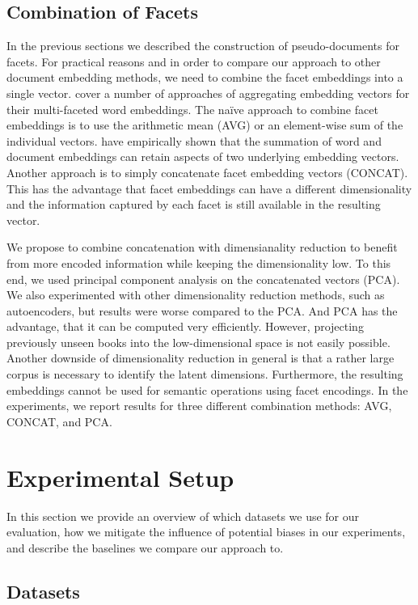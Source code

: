 \documentclass[11pt]{article}
\begin{document}
\subsection{Combination of Facets}

In the previous sections we described the construction of pseudo-documents for facets.
For practical reasons and in order to compare our approach to other document embedding methods, we need to combine the facet embeddings into a single vector.
\citet{rettig_fusing_2019} cover a number of approaches of aggregating embedding vectors for their multi-faceted word embeddings.
The na\"ive approach to combine facet embeddings is to use the arithmetic mean (AVG) or an element-wise sum of the individual vectors.
\citet{gittens_skip-gram_2017} have empirically shown that the summation of word and document embeddings can retain aspects of two underlying embedding vectors.
Another approach is to simply concatenate facet embedding vectors (CONCAT).
This has the advantage that facet embeddings can have a different dimensionality and the information captured by each facet is still available in the resulting vector.

We propose to combine concatenation with dimensianality reduction to benefit from more encoded information while keeping the dimensionality low.
To this end, we used principal component analysis on the concatenated vectors (PCA).
We also experimented with other dimensionality reduction methods, such as autoencoders, but results were worse compared to the PCA.
And PCA has the advantage, that it can be computed very efficiently.
However, projecting previously unseen books into the low-dimensional space is not easily possible.
Another downside of dimensionality reduction in general is that a rather large corpus is necessary to identify the latent dimensions. 
Furthermore, the resulting embeddings cannot be used for semantic operations using facet encodings.
In the experiments, we report results for three different combination methods: AVG, CONCAT, and PCA.

\section{Experimental Setup}

In this section we provide an overview of which datasets we use for our evaluation, how we mitigate the influence of potential biases in our experiments, and describe the baselines we compare our approach to.

\subsection{Datasets}
\end{document}
